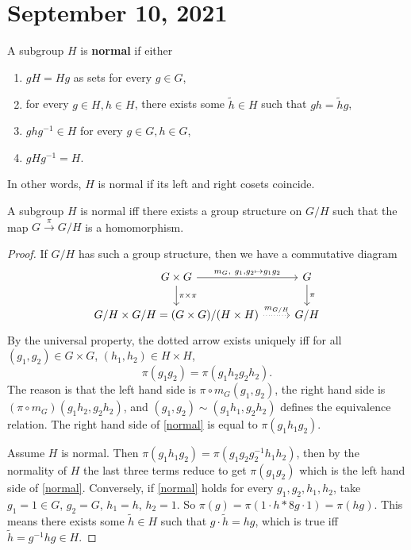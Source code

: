 \section{September 10, 2021} 

\begin{definition}[]
    A subgroup $H$ is \textbf{normal} if either
    \begin{enumerate}[label=(\alph*)]
    \setlength\itemsep{-.2em}
        \item $gH=Hg$ as sets for every $g \in G$,
        \item for every $g \in H, h \in H$, there exists some $\widetilde h \in H$ such that $gh=\widetilde hg$, 
        \item $gh g ^{-1} \in H$ for every $g \in G,h \in G$,
        \item $g H g^{-1}=H$.
    \end{enumerate}
In other words, $H$ is normal if its left and right cosets coincide.
\end{definition}
\begin{lemma}
    A subgroup $H$ is normal iff there exists a group structure on $G /H$ such that the map $G \xrightarrow{\pi} G /H$ is a homomorphism.
\end{lemma}
\begin{proof}
    If $G /H$ has such a group structure, then we have a commutative diagram \[
    \begin{tikzcd}
G\times G \arrow[r, "{m_G,\ g_1,g_2\mapsto g_1g_2}"] \arrow[d, "\pi \times \pi"] & G \arrow[d, "\pi"] \\
G/H\times G/H=(G\times G)/(H\times H) \arrow[r, dotted, "m_{G/H}"]                       & G/H               
\end{tikzcd}
    \] By the universal property, the dotted arrow exists uniquely iff for all $(g_1,g_2) \in G \times G$, $(h_1,h_2) \in H \times H$, 
    \begin{equation}\label{normal} 
    \pi(g_1g_2)=\pi(g_1h_2g_2h_2). 
    \end{equation}
    The reason is that the left hand side is $\pi \circ m_G(g_1,g_2)$, the right hand side is $(\pi \circ m_G)(g_1h_2,g_2h_2)$, and $(g_1,g_2)\sim (g_1h_1,g_2h_2)$ defines the equivalence relation. The right hand side of \cref{normal} is equal to $\pi(g_1h_1g_2)$.

    Assume $H$ is normal. Then $\pi(g_1h_1g_2)=\pi(g_1g_2g_2^{-1}h_1h_2)$, then by the normality of $H$ the last three terms reduce to get $\pi(g_1g_2)$ which is the left hand side of \cref{normal}. Conversely, if  \cref{normal} holds for every $g_1,g_2,h_1,h_2$, take $g_1=1 \in G$, $g_2=G$, $h_1=h$, $h_2=1$. So $\pi(g)=\pi(1 \cdot h *8g \cdot 1)=\pi(hg)$. This means there exists some $\widetilde h \in H$ such that $g \cdot \widetilde h=hg$, which is true iff $\widetilde h= g ^{-1} h g \in H$.
\end{proof}

